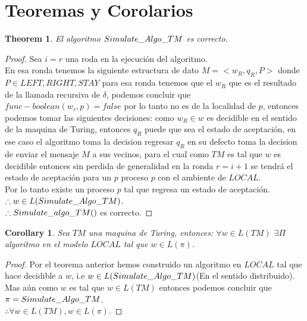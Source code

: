 \documentclass[10pt]{article}
\newtheorem*{corrolary}{Corollary}
\newtheorem{theorem}{Theorem}[section]
\begin{document}
    \section{Teoremas y Corolarios}\label{sec:teoremas-y-corolarios}
    \begin{theorem}
        El algoritmo $Simulate\char95 Algo\char95 TM$ es correcto.
    \end{theorem}
    \begin{proof}
        Sea $i=r$ una roda en la ejecución del algoritmo.\\
        En esa ronda tenemos la siguiente estructura de dato $M = <w_{R}, q_{R}, P>$ donde
        $P\in {LEFT,RIGHT,STAY}$ para esa ronda tenemos que el $w_{R}$ que es el resultado de la
        llamada recursiva de $\delta$, podemos concluir que $func-boolean(w_{r},p) = false $
        por lo tanto no es de la localidad de $p$, entonces podemos tomar las siguientes decisiones:
        como $w_{R}\in w$ es decidible en el sentido de la maquina de Turing, entonces $q_{R}$ puede que
        sea el estado de aceptación, en ese caso el algoritmo toma la decision regresar $q_{R}$ en su defecto
        toma la decision de enviar el mensaje $M$ a sus vecinos,
        para el cual como $TM$ es tal que $w$ es decidible entonces sin perdida de generalidad en la ronda $r=i+1$ se tendrá el estado de aceptación
        para un $p$ proceso $p$ con el ambiente de $LOCAL$.\\
        Por lo tanto existe un proceso $p$ tal que regresa un estado de aceptación.\\
        $\therefore w \in L(Simulate\char95 Algo\char95 TM)$.\\
        $\therefore Simulate\char95 algo\char95 TM()$ es correcto.
    \end{proof}

    \begin{corrolary}
        Sea $TM$ una maquina de Turing, entonces:
        $\forall w \in L(TM)$ $\exists \Pi$ algoritmo en el modelo $LOCAL$ tal que
        $w\in L(\pi)$.
    \end{corrolary}
    \begin{proof}
        Por el teorema anterior hemos construido un algoritmo en $LOCAL$ tal que
        hace decidible a $w$, i.e $w \in L(Simulate\char95 Algo\char95 TM)$(En el sentido distribuido).\\
        Mas aún como $w$ es tal que $w \in L(TM)$ entonces podemos concluir que $\pi = Simulate\char95 Algo\char95 TM$.\\
        $ \therefore \forall w \in L(TM), w\in L(\pi)$.
    \end{proof}
\end{document}

